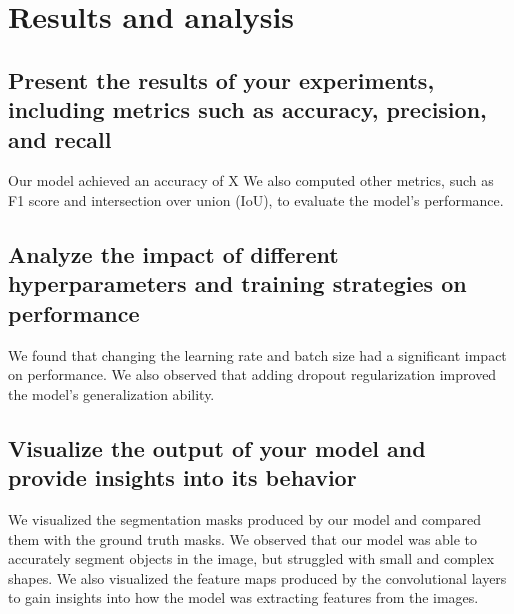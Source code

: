 



\chapter{Results and analysis}

    \section{Present the results of your experiments, including metrics such as accuracy, precision, and recall}

        Our model achieved an accuracy of X%
        We also computed other metrics, such as F1 score and intersection over union (IoU), to evaluate the model's performance.

    \section{Analyze the impact of different hyperparameters and training strategies on performance}

        We found that changing the learning rate and batch size had a significant impact on performance.
        We also observed that adding dropout regularization improved the model's generalization ability.

    \section{Visualize the output of your model and provide insights into its behavior}

        We visualized the segmentation masks produced by our model and compared them with the ground truth masks.
        We observed that our model was able to accurately segment objects in the image, but struggled with small and complex shapes.
        We also visualized the feature maps produced by the convolutional layers to gain insights into how the model was extracting features from the images.
